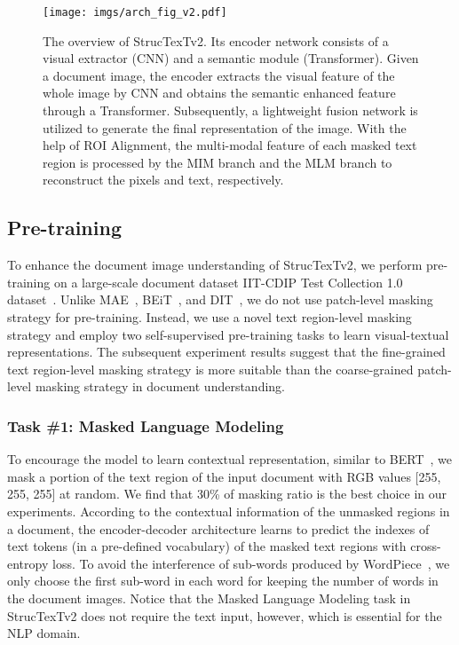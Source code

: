 \documentclass{article} \usepackage{iclr2023_conference,times}
\begin{document}
\begin{figure*}[t]
 \centering
 \texttt{[image: imgs/arch\_fig\_v2.pdf]}
\caption{The overview of StrucTexTv2. Its encoder network consists of a visual extractor (CNN) and a semantic module (Transformer). Given a document image, the encoder extracts the visual feature of the whole image by CNN and obtains the semantic enhanced feature through a Transformer. Subsequently, a lightweight fusion network is utilized to generate the final representation of the image. With the help of ROI Alignment, the multi-modal feature of each masked text region is processed by the MIM branch and the MLM branch to reconstruct the pixels and text, respectively.}
\label{fig:method_arch}
\vspace{-0.5em}
\end{figure*}













\subsection{Pre-training}

To enhance the document image understanding of StrucTexTv2, we perform pre-training on a large-scale document dataset IIT-CDIP Test Collection 1.0 dataset~\cite{sigir06cdip}. Unlike MAE~\cite{he2021masked}, BEiT~\cite{bao2021beit}, and DIT~\cite{li2022dit}, we do not use patch-level masking strategy for pre-training. Instead, we use a novel text region-level masking strategy and employ two self-supervised pre-training tasks to learn visual-textual representations. The subsequent experiment results suggest that the fine-grained text region-level masking strategy is more suitable than the coarse-grained patch-level masking strategy in document understanding.

\subsubsection{Task \#1: Masked Language Modeling}
To encourage the model to learn contextual representation, similar to BERT~\cite{devlin2018bert}, we mask a portion of the text region of the input document with RGB values [255, 255, 255] at random. We find that 30\% of masking ratio is the best choice in our experiments. According to the contextual information of the unmasked regions in a document, the encoder-decoder architecture learns to predict the indexes of text tokens (in a pre-defined vocabulary) of the masked text regions with cross-entropy loss. To avoid the interference of sub-words produced by WordPiece~\cite{song2020fast}, we only choose the first sub-word in each word for keeping the number of words in the document images. Notice that the Masked Language Modeling task in StrucTexTv2 does not require the text input, however, which is essential for the NLP domain.
\end{document}
